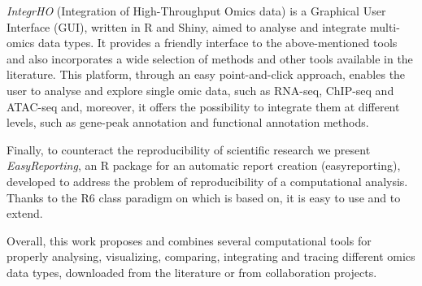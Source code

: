 {\textit{IntegrHO} (Integration of High-Throughput Omics data) is a Graphical User Interface (GUI), written in R and Shiny, aimed to analyse and integrate multi-omics data types. It provides a friendly interface to the above-mentioned tools and also incorporates a wide selection of methods and other tools available in the literature. This platform, through an easy point-and-click approach, enables the user to analyse and explore single omic data, such as RNA-seq, ChIP-seq and ATAC-seq and, moreover, it offers the possibility to integrate them at different levels, such as gene-peak annotation and functional annotation methods.

Finally, to counteract the reproducibility of scientific research we present \textit{EasyReporting}, an R package for an automatic report creation (easyreporting), developed to address the problem of reproducibility of a computational analysis.  
Thanks to the R6 class paradigm on which is based on, it is easy to use and to extend.

Overall, this work proposes and combines several computational tools for properly analysing, visualizing, comparing, integrating and tracing different omics data types, downloaded from the literature or from collaboration projects.
}